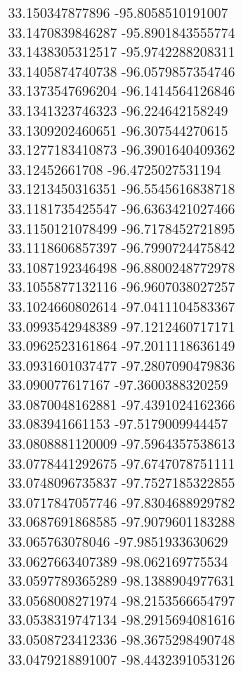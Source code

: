 {33.150347877896	-95.8058510191007\\
33.1470839846287	-95.8901843555774\\
33.1438305312517	-95.9742288208311\\
33.1405874740738	-96.0579857354746\\
33.1373547696204	-96.1414564126846\\
33.1341323746323	-96.224642158249\\
33.1309202460651	-96.307544270615\\
33.1277183410873	-96.3901640409362\\
33.12452661708	-96.4725027531194\\
33.1213450316351	-96.5545616838718\\
33.1181735425547	-96.6363421027466\\
33.1150121078499	-96.7178452721895\\
33.1118606857397	-96.7990724475842\\
33.1087192346498	-96.8800248772978\\
33.1055877132116	-96.9607038027257\\
33.1024660802614	-97.0411104583367\\
33.0993542948389	-97.1212460717171\\
33.0962523161864	-97.2011118636149\\
33.0931601037477	-97.2807090479836\\
33.090077617167	-97.3600388320259\\
33.0870048162881	-97.4391024162366\\
33.083941661153	-97.5179009944457\\
33.0808881120009	-97.5964357538613\\
33.0778441292675	-97.6747078751111\\
33.0748096735837	-97.7527185322855\\
33.0717847057746	-97.8304688929782\\
33.0687691868585	-97.9079601183288\\
33.065763078046	-97.9851933630629\\
33.0627663407389	-98.062169775534\\
33.0597789365289	-98.1388904977631\\
33.0568008271974	-98.2153566654797\\
33.0538319747134	-98.2915694081616\\
33.0508723412336	-98.3675298490748\\
33.0479218891007	-98.4432391053126\\
}

